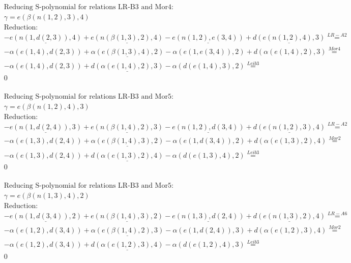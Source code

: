 \documentclass[11pt]{amsart}
\begin{document}
\begin{align*} 
& \text{Reducing S-polynomial for relations LR-B3 and Mor4:} \\ 
& \gamma = e(\beta(n(1,2),3),4) \\ 
& \text{Reduction}: \\& - \underline{e(n(1,d(2,3)),4)} + \underline{e(n(\beta(1,3),2),4)} - \underline{e(n(1,2),e(3,4))} + \underline{d(e(n(1,2),4),3)} \stackrel{ LR-A2 }{=}  \\ 
& - \alpha(e(1,4),d(2,3)) + \underline{\alpha(e(\beta(1,3),4),2)} - \alpha(e(1,e(3,4)),2) + d(\alpha(e(1,4),2),3) \stackrel{ Mor4 }{=}  \\ 
& - \alpha(e(1,4),d(2,3)) + \underline{d(\alpha(e(1,4),2),3)} - \alpha(d(e(1,4),3),2) \stackrel{ Leib3 }{=}  \\ 
&0\\ 
\end{align*} 
 
\begin{align*} 
& \text{Reducing S-polynomial for relations LR-B3 and Mor5:} \\ 
& \gamma = e(\beta(n(1,2),4),3) \\ 
& \text{Reduction}: \\& - \underline{e(n(1,d(2,4)),3)} + \underline{e(n(\beta(1,4),2),3)} - \underline{e(n(1,2),d(3,4))} + \underline{d(e(n(1,2),3),4)} \stackrel{ LR-A2 }{=}  \\ 
& - \alpha(e(1,3),d(2,4)) + \underline{\alpha(e(\beta(1,4),3),2)} - \alpha(e(1,d(3,4)),2) + d(\alpha(e(1,3),2),4) \stackrel{ Mor2 }{=}  \\ 
& - \alpha(e(1,3),d(2,4)) + \underline{d(\alpha(e(1,3),2),4)} - \alpha(d(e(1,3),4),2) \stackrel{ Leib3 }{=}  \\ 
&0\\ 
\end{align*} 
 
\begin{align*} 
& \text{Reducing S-polynomial for relations LR-B3 and Mor5:} \\ 
& \gamma = e(\beta(n(1,3),4),2) \\ 
& \text{Reduction}: \\& - \underline{e(n(1,d(3,4)),2)} + \underline{e(n(\beta(1,4),3),2)} - \underline{e(n(1,3),d(2,4))} + \underline{d(e(n(1,3),2),4)} \stackrel{ LR-A6 }{=}  \\ 
& - \alpha(e(1,2),d(3,4)) + \underline{\alpha(e(\beta(1,4),2),3)} - \alpha(e(1,d(2,4)),3) + d(\alpha(e(1,2),3),4) \stackrel{ Mor2 }{=}  \\ 
& - \alpha(e(1,2),d(3,4)) + \underline{d(\alpha(e(1,2),3),4)} - \alpha(d(e(1,2),4),3) \stackrel{ Leib3 }{=}  \\ 
&0\\ 
\end{align*} 
 
\end{document}
